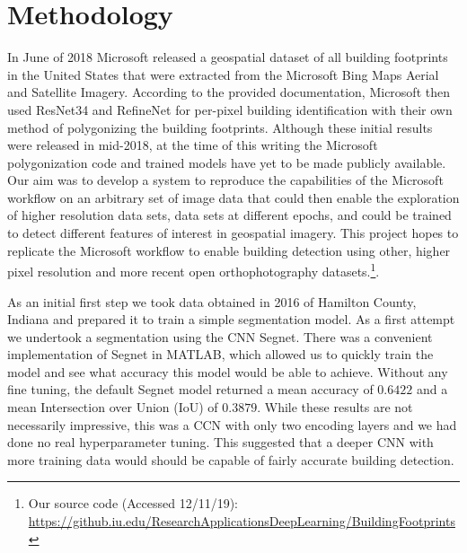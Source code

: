 \documentclass[acmtog, authorversion]{acmart}
\begin{document}
\section{Methodology}

In June of 2018 Microsoft released a geospatial dataset of all building footprints in the United States that were extracted from the Microsoft Bing Maps Aerial and Satellite Imagery\cite{Microsoft2019}. According to the provided documentation, Microsoft then used ResNet34 and RefineNet for per-pixel building identification with their own method of polygonizing the building footprints. Although these initial results were released in mid-2018, at the time of this writing the Microsoft polygonization code and trained models have yet to be made publicly available. Our aim was to develop a system to reproduce the capabilities of the Microsoft workflow on an arbitrary set of image data that could then enable the exploration of higher resolution data sets, data sets at different epochs, and could be trained to detect different features of interest in geospatial imagery. This project hopes to replicate the Microsoft workflow to enable building detection using other, higher pixel resolution and more recent open orthophotography datasets.\footnote{Our source code (Accessed 12/11/19):\\ \url{https://github.iu.edu/ResearchApplicationsDeepLearning/BuildingFootprints}}.


As an initial first step we took data obtained in 2016 of Hamilton County, Indiana and prepared it to train a simple segmentation model.  
As a first attempt we undertook a segmentation using the CNN Segnet. There was a convenient implementation of Segnet in MATLAB, which allowed us to quickly train the model and see what accuracy this model would be able to achieve. Without any fine tuning, the default Segnet model returned a mean accuracy of $0.6422$ and a mean Intersection over Union (IoU) of $0.3879$. While these results are not necessarily impressive, this was a CCN with only two encoding layers and we had done no real hyperparameter tuning. This suggested that a deeper CNN with more training data would should be capable of fairly accurate building detection.
\end{document}
